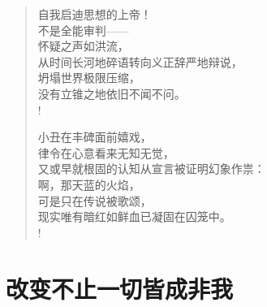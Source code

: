 \documentclass[UTF8, 12pt, a4paper]{ctexrep} %
\begin{document}
\begin{verse}
    自我启迪思想的上帝！\\
    不是全能审判——\\
    怀疑之声如洪流，\\
    从时间长河地碎语转向义正辞严地辩说，\\
    坍塌世界极限压缩，\\
    没有立锥之地依旧不闻不问。\\!

    小丑在丰碑面前嬉戏，\\
    律令在心意看来无知无觉，\\
    又或早就根固的认知从宣言被证明幻象作祟：\\
    啊，那天蓝的火焰，\\
    可是只在传说被歌颂，\\
    现实唯有暗红如鲜血已凝固在囚笼中。\\!

\end{verse}
\newpage

\section{改变不止一切皆成非我}
\newpage
\end{document}
